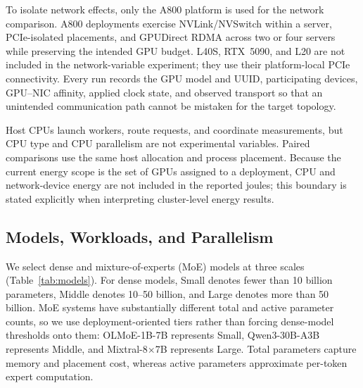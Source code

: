 To isolate network effects, only the A800 platform is used for the network comparison. A800 deployments exercise NVLink/NVSwitch within a server, PCIe-isolated placements, and GPUDirect RDMA across two or four servers while preserving the intended GPU budget. L40S, RTX~5090, and L20 are not included in the network-variable experiment; they use their platform-local PCIe connectivity. Every run records the GPU model and UUID, participating devices, GPU--NIC affinity, applied clock state, and observed transport so that an unintended communication path cannot be mistaken for the target topology.

Host CPUs launch workers, route requests, and coordinate measurements, but CPU type and CPU parallelism are not experimental variables. Paired comparisons use the same host allocation and process placement. Because the current energy scope is the set of GPUs assigned to a deployment, CPU and network-device energy are not included in the reported joules; this boundary is stated explicitly when interpreting cluster-level energy results.

\subsection{Models, Workloads, and Parallelism}
\label{sec:models-workloads}

We select dense and mixture-of-experts (MoE) models at three scales (Table~\ref{tab:models}). For dense models, Small denotes fewer than 10 billion parameters, Middle denotes 10--50 billion, and Large denotes more than 50 billion. MoE systems have substantially different total and active parameter counts, so we use deployment-oriented tiers rather than forcing dense-model thresholds onto them: OLMoE-1B-7B represents Small, Qwen3-30B-A3B represents Middle, and Mixtral-8$\times$7B represents Large. Total parameters capture memory and placement cost, whereas active parameters approximate per-token expert computation.



